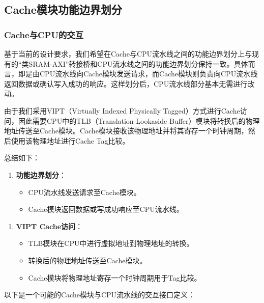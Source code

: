 \subsection{Cache模块功能边界划分}\label{sec:09-cache-011}

\subsubsection{Cache与CPU的交互}\label{sec:09-cache-012}

基于当前的设计要求，我们希望在Cache与CPU流水线之间的功能边界划分上与现有的``类SRAM-AXI''转接桥和CPU流水线之间的功能边界划分保持一致。具体而言，即是由CPU流水线向Cache模块发送请求，而Cache模块则负责向CPU流水线返回数据或确认写入成功的响应。这样划分后，CPU流水线部分基本无需进行改动。

由于我们采用VIPT（Virtually Indexed Physically Tagged）方式进行Cache访问，因此需要CPU中的TLB（Translation Lookaside Buffer）模块将转换后的物理地址传送至Cache模块。Cache模块接收该物理地址并将其寄存一个时钟周期，然后使用该物理地址进行Cache Tag比较。

总结如下：

\begin{enumerate}
\item \textbf{功能边界划分}：
\begin{itemize}
\item CPU流水线发送请求至Cache模块。
\item Cache模块返回数据或写成功响应至CPU流水线。
\end{itemize}
\end{enumerate}


\begin{enumerate}
\def\labelenumi{\arabic{enumi}.}
\setcounter{enumi}{1}
\tightlist
\item
  \textbf{VIPT Cache访问}：

  \begin{itemize}
  \tightlist
  \item
    TLB模块在CPU中进行虚拟地址到物理地址的转换。
  \item
    转换后的物理地址传送至Cache模块。
  \item
    Cache模块将物理地址寄存一个时钟周期用于Tag比较。
  \end{itemize}
\end{enumerate}

以下是一个可能的Cache模块与CPU流水线的交互接口定义：

